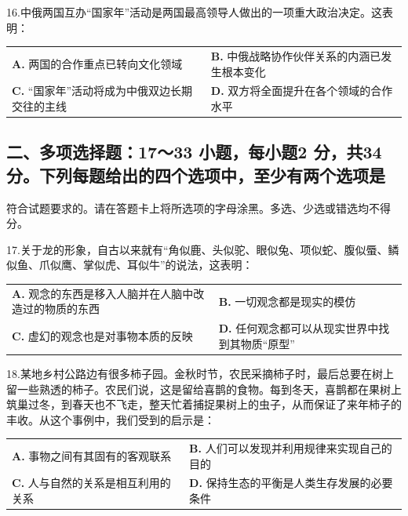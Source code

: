 \documentclass[UTF8,11pt]{ctexart}
\begin{document}
16.中俄两国互办“国家年”活动是两国最高领导人做出的一项重大政治决定。这表明：


\begin{center}\begin{tabular}{>{\raggedright\arraybackslash}p{\dimexpr(\linewidth-4\tabcolsep)/2\relax}>{\raggedright\arraybackslash}p{\dimexpr(\linewidth-4\tabcolsep)/2\relax}}
\textbf{A.} 两国的合作重点已转向文化领域 & \textbf{B.} 中俄战略协作伙伴关系的内涵已发生根本变化\\[.35em]
\textbf{C.} “国家年”活动将成为中俄双边长期交往的主线 & \textbf{D.} 双方将全面提升在各个领域的合作水平\\[.35em]\end{tabular}\end{center}

\subsection*{二、多项选择题：17～33 小题，每小题2 分，共34 分。下列每题给出的四个选项中，至少有两个选项是}

符合试题要求的。请在答题卡上将所选项的字母涂黑。多选、少选或错选均不得分。


17.关于龙的形象，自古以来就有“角似鹿、头似驼、眼似兔、项似蛇、腹似蜃、鳞似鱼、爪似鹰、掌似虎、耳似牛”的说法，这表明：


\begin{center}\begin{tabular}{>{\raggedright\arraybackslash}p{\dimexpr(\linewidth-4\tabcolsep)/2\relax}>{\raggedright\arraybackslash}p{\dimexpr(\linewidth-4\tabcolsep)/2\relax}}
\textbf{A.} 观念的东西是移入人脑并在人脑中改造过的物质的东西 & \textbf{B.} 一切观念都是现实的模仿\\[.35em]
\textbf{C.} 虚幻的观念也是对事物本质的反映 & \textbf{D.} 任何观念都可以从现实世界中找到其物质“原型”\\[.35em]\end{tabular}\end{center}

18.某地乡村公路边有很多柿子园。金秋时节，农民采摘柿子时，最后总要在树上留一些熟透的柿子。农民们说，这是留给喜鹊的食物。每到冬天，喜鹊都在果树上筑巢过冬，到春天也不飞走，整天忙着捕捉果树上的虫子，从而保证了来年柿子的丰收。从这个事例中，我们受到的启示是：


\begin{center}\begin{tabular}{>{\raggedright\arraybackslash}p{\dimexpr(\linewidth-4\tabcolsep)/2\relax}>{\raggedright\arraybackslash}p{\dimexpr(\linewidth-4\tabcolsep)/2\relax}}
\textbf{A.} 事物之间有其固有的客观联系 & \textbf{B.} 人们可以发现并利用规律来实现自己的目的\\[.35em]
\textbf{C.} 人与自然的关系是相互利用的关系 & \textbf{D.} 保持生态的平衡是人类生存发展的必要条件\\[.35em]\end{tabular}\end{center}
\end{document}

